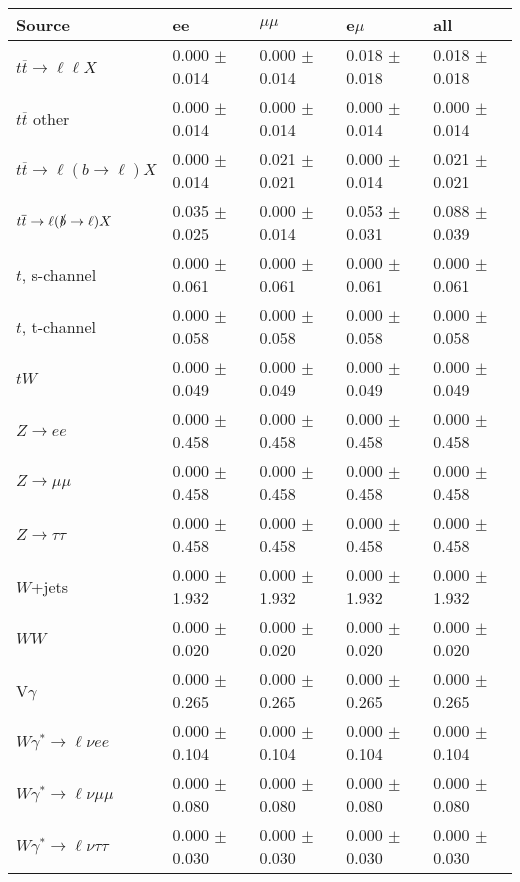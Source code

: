 \begin{tabular}{l | l l l l}
\hline\hline
 Source  &  ee  &  $\mu\mu$  &  e$\mu$  &  all \\
\hline
$t\overline{t}\rightarrow \ell\ell X$ &  0.000 $\pm$  0.014 &  0.000 $\pm$  0.014 &  0.018 $\pm$  0.018 &  0.018 $\pm$  0.018\\
$t\overline{t}$ other &  0.000 $\pm$  0.014 &  0.000 $\pm$  0.014 &  0.000 $\pm$  0.014 &  0.000 $\pm$  0.014\\
$t\overline{t}\rightarrow \ell(b\rightarrow \ell)X$ &  0.000 $\pm$  0.014 &  0.021 $\pm$  0.021 &  0.000 $\pm$  0.014 &  0.021 $\pm$  0.021\\
$t\overline{t}\rightarrow \ell(\slashed{b}\rightarrow \ell)X$ &  0.035 $\pm$  0.025 &  0.000 $\pm$  0.014 &  0.053 $\pm$  0.031 &  0.088 $\pm$  0.039\\
\hline
$t$, s-channel &  0.000 $\pm$  0.061 &  0.000 $\pm$  0.061 &  0.000 $\pm$  0.061 &  0.000 $\pm$  0.061\\
$t$, t-channel &  0.000 $\pm$  0.058 &  0.000 $\pm$  0.058 &  0.000 $\pm$  0.058 &  0.000 $\pm$  0.058\\
$tW$ &  0.000 $\pm$  0.049 &  0.000 $\pm$  0.049 &  0.000 $\pm$  0.049 &  0.000 $\pm$  0.049\\
\hline
$Z\rightarrow ee$ &  0.000 $\pm$  0.458 &  0.000 $\pm$  0.458 &  0.000 $\pm$  0.458 &  0.000 $\pm$  0.458\\
$Z\rightarrow\mu\mu$ &  0.000 $\pm$  0.458 &  0.000 $\pm$  0.458 &  0.000 $\pm$  0.458 &  0.000 $\pm$  0.458\\
$Z\rightarrow\tau\tau$ &  0.000 $\pm$  0.458 &  0.000 $\pm$  0.458 &  0.000 $\pm$  0.458 &  0.000 $\pm$  0.458\\
$W$+jets &  0.000 $\pm$  1.932 &  0.000 $\pm$  1.932 &  0.000 $\pm$  1.932 &  0.000 $\pm$  1.932\\
$WW$ &  0.000 $\pm$  0.020 &  0.000 $\pm$  0.020 &  0.000 $\pm$  0.020 &  0.000 $\pm$  0.020\\
\hline
V$\gamma$ &  0.000 $\pm$  0.265 &  0.000 $\pm$  0.265 &  0.000 $\pm$  0.265 &  0.000 $\pm$  0.265\\
$W\gamma^{*}\rightarrow\ell\nu e e$ &  0.000 $\pm$  0.104 &  0.000 $\pm$  0.104 &  0.000 $\pm$  0.104 &  0.000 $\pm$  0.104\\
$W\gamma^{*}\rightarrow\ell\nu\mu\mu$ &  0.000 $\pm$  0.080 &  0.000 $\pm$  0.080 &  0.000 $\pm$  0.080 &  0.000 $\pm$  0.080\\
$W\gamma^{*}\rightarrow\ell\nu\tau\tau$ &  0.000 $\pm$  0.030 &  0.000 $\pm$  0.030 &  0.000 $\pm$  0.030 &  0.000 $\pm$  0.030\\

\end{tabular}
